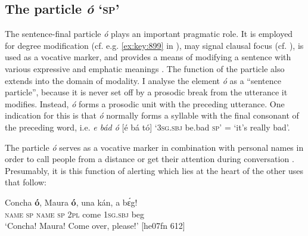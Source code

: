 \ea%
    \label{ex:key:1669}
\z\z

\subsection{The particle \textit{ó} ‘\textsc{sp’}}\label{sec:12.2.5}

The sentence-final particle \textit{ó} plays an important pragmatic role. It is employed for degree modification (cf. e.g. \ref{ex:key:899} in ), may signal clausal focus (cf. ), is used as a vocative marker, and provides a means of modifying a sentence with various expressive and emphatic meanings . The function of the particle also extends into the domain of modality. I analyse the element \textit{ó} as a “sentence particle”, because it is never set off by a prosodic break from the utterance it modifies. Instead, \textit{ó} forms a prosodic unit with the preceding utterance. One indication for this is that \textit{ó} normally forms a syllable with the final consonant of the preceding word, i.e. \textit{e bád ó} [é bá tó] ‘\textsc{3sg.sbj} be.bad \textsc{sp’} = ‘it’s really bad’.


The particle \textit{ó} serves as a vocative marker in combination with personal names in order to call people from a distance  or get their attention during conversation . Presumably, it is this function of alerting which lies at the heart of the other uses that follow: 



\ea%
    \label{ex:key:1670}
    \gll Concha  \textbf{ó},  Maura  \textbf{ó},  una  kán,    a    bɛ́g!\\
\textsc{name}  \textsc{sp}  \textsc{name}  \textsc{sp}  \textsc{2pl}  come  \textsc{1sg.sbj}  beg\\

\glt ‘Concha! Maura! Come over, please!’ [he07fn 612]
\z


